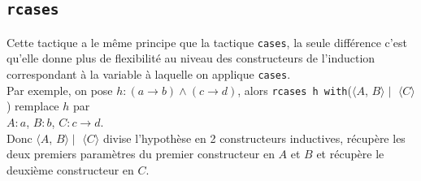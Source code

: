    \subsection{ \texttt{rcases}}
     Cette tactique a le même principe que la tactique \texttt{cases}, la seule différence c'est qu'elle donne plus de flexibilité au niveau des constructeurs de l'induction correspondant à la variable à laquelle on applique \texttt{cases}. \\ Par exemple, on pose $h:(a\rightarrow b)\wedge(c\rightarrow d)$, alors \texttt{rcases h with}($\langle A$, $B \rangle \mid $ $\langle C \rangle$) remplace $h$ par \\ $A:a$, $B:b$, $C:c\rightarrow d$.\\ Donc $\langle A$, $B \rangle \mid$ $\langle C\rangle$ divise l'hypothèse en 2 constructeurs inductives, récupère les deux premiers paramètres du premier constructeur en $A$ et $B$ et récupère le deuxième constructeur en $C$. 
